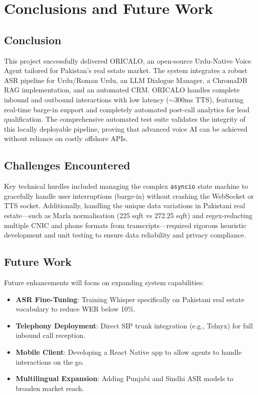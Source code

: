 \chapter{Conclusions and Future Work}
\label{ch:conclusions}

\section{Conclusion}

This project successfully delivered ORICALO, an open-source Urdu-Native Voice Agent tailored for Pakistan's real estate market. The system integrates a robust ASR pipeline for Urdu/Roman Urdu, an LLM Dialogue Manager, a ChromaDB RAG implementation, and an automated CRM. ORICALO handles complete inbound and outbound interactions with low latency ($\sim$300ms TTS), featuring real-time barge-in support and completely automated post-call analytics for lead qualification. The comprehensive automated test suite validates the integrity of this locally deployable pipeline, proving that advanced voice AI can be achieved without reliance on costly offshore APIs.

\section{Challenges Encountered}

Key technical hurdles included managing the complex \texttt{asyncio} state machine to gracefully handle user interruptions (barge-in) without crashing the WebSocket or TTS socket. Additionally, handling the unique data variations in Pakistani real estate---such as Marla normalisation (225 sqft vs 272.25 sqft) and regex-redacting multiple CNIC and phone formats from transcripts---required rigorous heuristic development and unit testing to ensure data reliability and privacy compliance.

\section{Future Work}

Future enhancements will focus on expanding system capabilities:
\begin{itemize}
    \item \textbf{ASR Fine-Tuning}: Training Whisper specifically on Pakistani real estate vocabulary to reduce WER below 10\%.
    \item \textbf{Telephony Deployment}: Direct SIP trunk integration (e.g., Telnyx) for full inbound call reception.
    \item \textbf{Mobile Client}: Developing a React Native app to allow agents to handle interactions on the go.
    \item \textbf{Multilingual Expansion}: Adding Punjabi and Sindhi ASR models to broaden market reach.
\end{itemize}
